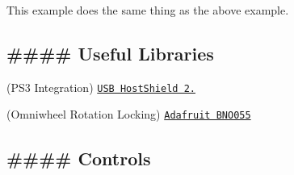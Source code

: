This example does the same thing as the above example.

\subsection*{\#\#\#\# Useful Libraries }


\begin{DoxyEnumerate}
\item (P\+S3 Integration) \href{https://github.com/felis/USB_Host_Shield_2.0}{\tt U\+SB Host\+Shield 2.}
\item (Omniwheel Rotation Locking) \href{https://github.com/adafruit/Adafruit_BNO055}{\tt Adafruit B\+N\+O055}
\end{DoxyEnumerate}

\subsection*{\#\#\#\# Controls }


